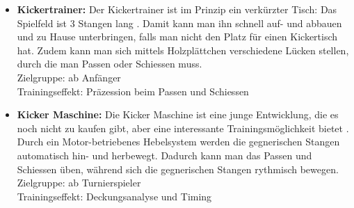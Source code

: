 \begin{itemize}
\item {\bf Kickertrainer:}
Der Kickertrainer ist im Prinzip ein verkürzter Tisch: Das Spielfeld ist 3 Stangen lang \citep{www:kickertrainer}. 
Damit kann man ihn schnell auf- und abbauen und zu Hause unterbringen, falls man nicht den Platz für einen Kickertisch hat.
Zudem kann man sich mittels Holzplättchen verschiedene Lücken stellen, durch die man Passen oder Schiessen muss. 
\\
Zielgruppe: ab Anfänger 
\\
Trainingseffekt: Präzession beim Passen und Schiessen
\item {\bf Kicker Maschine:} 
Die Kicker Maschine ist eine junge Entwicklung, die es noch nicht zu kaufen gibt, aber eine interessante Trainingsmöglichkeit bietet \citep{www:kickermaschine}. 
Durch ein Motor-betriebenes Hebelsystem werden die gegnerischen Stangen automatisch hin- und herbewegt. 
Dadurch kann man das Passen und Schiessen üben, während sich die gegnerischen Stangen rythmisch bewegen.
\\
Zielgruppe: ab Turnierspieler 
\\
Trainingseffekt: Deckungsanalyse und Timing

\end{itemize}
